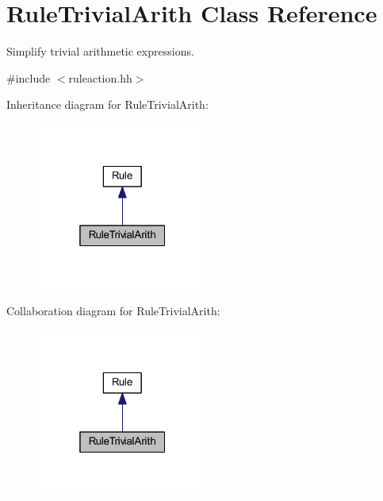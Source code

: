 \hypertarget{class_rule_trivial_arith}{}\section{Rule\+Trivial\+Arith Class Reference}
\label{class_rule_trivial_arith}


Simplify trivial arithmetic expressions.  




{\ttfamily \#include $<$ruleaction.\+hh$>$}



Inheritance diagram for Rule\+Trivial\+Arith\+:
\nopagebreak
\begin{figure}[H]
\begin{center}
\leavevmode
\includegraphics[width=160pt]{class_rule_trivial_arith__inherit__graph}
\end{center}
\end{figure}


Collaboration diagram for Rule\+Trivial\+Arith\+:
\nopagebreak
\begin{figure}[H]
\begin{center}
\leavevmode
\includegraphics[width=160pt]{class_rule_trivial_arith__coll__graph}
\end{center}
\end{figure}
